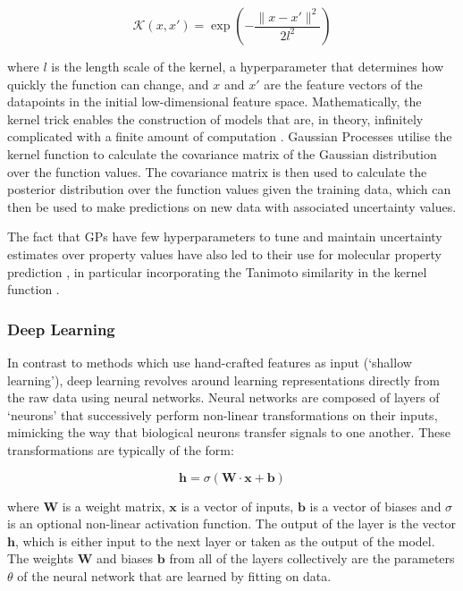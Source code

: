 \begin{equation}
    \mathcal{K}(x , x') = \exp\left(-\frac{\|x - x'\|^{2}}{2l^{2}}\right)
\end{equation}

where $l$ is the length scale of the kernel, a hyperparameter that determines how quickly the function can change, and $x$ and $x'$ are the feature vectors of the datapoints in the initial low-dimensional feature space. Mathematically, the kernel trick enables the construction of models that are, in theory, infinitely complicated with a finite amount of computation \cite{Hofmann2008kernel}. Gaussian Processes utilise the kernel function to calculate the covariance matrix of the Gaussian distribution over the function values. The covariance matrix is then used to calculate the posterior distribution over the function values given the training data, which can then be used to make predictions on new data with associated uncertainty values.

The fact that GPs have few hyperparameters to tune and maintain uncertainty estimates over property values have also led to their use for molecular property prediction \cite{Obrezanova2007GPQSAR, McCorkindale2020Soap, Jorner2021ActiviationEnergiesGPR}, in particular incorporating the Tanimoto similarity in the kernel function \cite{Swamidass2005kernels, Griffiths2022photoswitches}.

\subsubsection{Deep Learning}

In contrast to methods which use hand-crafted features as input (`shallow learning'), deep learning revolves around learning representations directly from the raw data using neural networks. Neural networks are composed of layers of `neurons' that successively perform non-linear transformations on their inputs, mimicking the way that biological neurons transfer signals to one another. These transformations are typically of the form:

\begin{equation}
    \textbf{h} = \sigma(\mathbf{W} \cdot \mathbf{x} + \mathbf{b})
\end{equation}

where $\mathbf{W}$ is a weight matrix, $\mathbf{x}$ is a vector of inputs, $\mathbf{b}$ is a vector of biases and $\sigma$ is an optional non-linear activation function. The output of the layer is the vector $\mathbf{h}$, which is either input to the next layer or taken as the output of the model. The weights $\mathbf{W}$ and biases $\mathbf{b}$ from all of the layers collectively are the parameters $\theta$ of the neural network that are learned by fitting on data.


